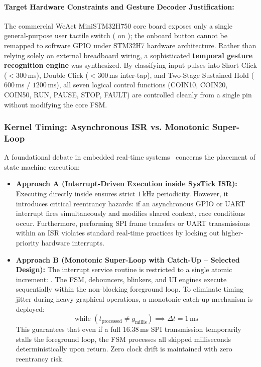 \paragraph{Target Hardware Constraints and Gesture Decoder Justification:}
The commercial WeAct MiniSTM32H750 core board exposes only a single general-purpose user tactile switch ( on ); the onboard  button cannot be remapped to software GPIO under STM32H7 hardware architecture. Rather than relying solely on external breadboard wiring, a sophisticated \textbf{temporal gesture recognition engine} was synthesized. By classifying input pulses into Short Click ($<300$\,ms), Double Click ($<300$\,ms inter-tap), and Two-Stage Sustained Hold ($600$\,ms / $1200$\,ms), all seven logical control functions (COIN10, COIN20, COIN50, RUN, PAUSE, STOP, FAULT) are controlled cleanly from a single pin without modifying the core FSM.

\subsubsection{Kernel Timing: Asynchronous ISR vs. Monotonic Super-Loop}

A foundational debate in embedded real-time systems~\cite{kopetz} concerns the placement of state machine execution:
\begin{itemize}
  \item \textbf{Approach A (Interrupt-Driven Execution inside SysTick ISR):}
        Executing  directly inside  ensures strict $1$\,kHz periodicity. However, it introduces critical reentrancy hazards: if an asynchronous GPIO or UART interrupt fires simultaneously and modifies shared context, race conditions occur. Furthermore, performing SPI frame transfers or UART transmissions within an ISR violates standard real-time practices by locking out higher-priority hardware interrupts.
  \item \textbf{Approach B (Monotonic Super-Loop with Catch-Up -- Selected Design):}
        The interrupt service routine is restricted to a single atomic increment: . The FSM, debouncers, blinkers, and UI engines execute sequentially within the non-blocking foreground loop. To eliminate timing jitter during heavy graphical operations, a monotonic catch-up mechanism is deployed:
        \begin{equation}
          \text{while } (t_{\text{processed}} \ne g_{\text{millis}}) \implies \Delta t = 1\,\text{ms}
        \end{equation}
        This guarantees that even if a full $16.38$\,ms SPI transmission temporarily stalls the foreground loop, the FSM processes all skipped milliseconds deterministically upon return. Zero clock drift is maintained with zero reentrancy risk.
\end{itemize}

